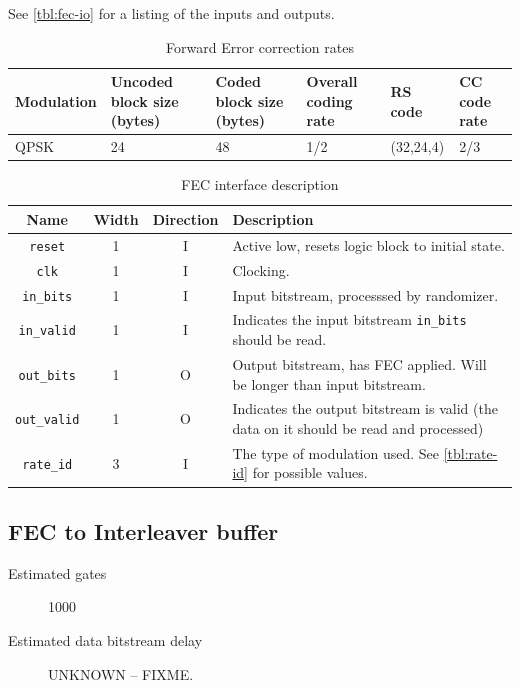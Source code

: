 \documentclass[dvips,10pt,twocolumn]{article}
\newcommand{\wire}{\texttt}
\begin{document}
See \autoref{tbl:fec-io} for a listing of the inputs and outputs.

\begin{table}
	\begin{tabularx}{\linewidth}{X|X|X|X|X|X}
	\label{tbl:fec-param}
		Modulation & Uncoded block size (bytes) &
		Coded block size (bytes) & Overall coding
		rate & RS code & CC code rate \\ \hline
		QPSK & 24 & 48 & 1/2 & (32,24,4) & 2/3 \\
	\end{tabularx}
	\caption{Forward Error correction rates}
\end{table}

\begin{table} \begin{tabularx}{\linewidth}{c|c|c|X}
	\label{tbl:fec-io}
	Name & Width & Direction & Description \\ \hline

	\wire{reset} & 1 & I & Active low, resets logic block to initial
	state. \\

	\wire{clk}   & 1 & I & Clocking. \\

	\wire{in\_bits} & 1 & I & Input bitstream, processsed by randomizer.
	\\

	\wire{in\_valid} & 1 & I & Indicates the input bitstream
	\wire{in\_bits} should be read.\\

	\wire{out\_bits} & 1 & O & Output bitstream, has FEC
	applied. Will be longer than input bitstream. \\

	\wire{out\_valid} & 1 & O & Indicates the output bitstream
	is valid (the data on it should be read and processed) \\

	\wire{rate\_id} & 3 & I & The type of modulation used. See
	\autoref{tbl:rate-id} for possible values.

\end{tabularx} \caption{FEC interface description} \end{table}


\subsection{FEC to Interleaver buffer}
\label{sec:fec_buffer}
\begin{description}
	\item[Estimated gates] 1000
	\item[Estimated data bitstream delay] UNKNOWN -- FIXME.
\end{description}
\end{document}
